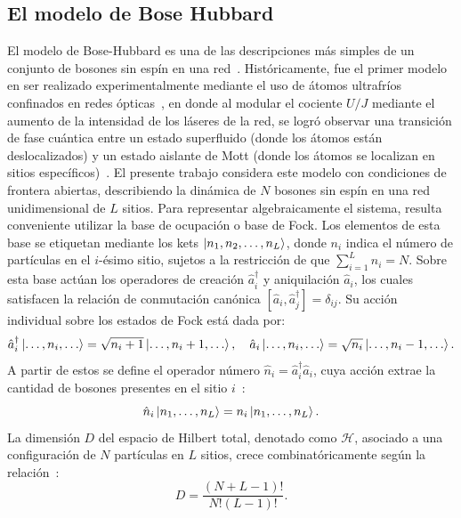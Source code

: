 \documentclass[10pt,a4paper]{article}
\begin{document}
\subsection{El modelo de Bose Hubbard}\label{sec:BH}
El modelo de Bose-Hubbard es una de las descripciones más simples de un conjunto de bosones sin espín en una red~\cite{delacruz2020quantum}. Históricamente, fue el primer modelo en ser realizado experimentalmente mediante el uso de átomos ultrafríos confinados en redes ópticas~\cite{Jaksch1998, greiner2002quantum}, 
en donde al modular el cociente $U/J$ mediante el aumento de la intensidad de los láseres de la red, se logró observar una transición de fase cuántica entre un estado superfluido (donde los átomos están deslocalizados)
 y un estado aislante de Mott (donde los átomos se localizan en sitios específicos)~\cite{greiner2002quantum}. El presente trabajo considera este modelo con condiciones de frontera abiertas, describiendo la dinámica de $N$ bosones sin espín en una red unidimensional de $L$ sitios. Para representar algebraicamente el sistema, resulta conveniente utilizar la base de ocupación o base de Fock. Los elementos de esta base se etiquetan mediante los kets $\ket{n_1,n_2,\dots,n_L}$, donde $n_i$ indica el número de partículas en el $i$-ésimo sitio,
 sujetos a la restricción de que $\sum_{i=1}^{L} n_i = N$. Sobre esta base actúan los operadores de creación $\hat{a}_i^\dagger$ y aniquilación $\hat{a}_i$, 
los cuales satisfacen la relación de conmutación canónica $[\hat{a}_i, \hat{a}_j^\dagger] = \delta_{ij}$. Su acción individual sobre los estados de Fock está dada por:
\begin{equation}
    \hat{a}_i^\dagger \ket{\dots, n_i, \dots} = \sqrt{n_i + 1} \ket{\dots, n_i + 1, \dots}, \quad
    \hat{a}_i \ket{\dots, n_i, \dots} = \sqrt{n_i} \ket{\dots, n_i - 1, \dots}.
\end{equation}
A partir de estos se define el operador número $\hat{n}_i = \hat{a}_i^\dagger \hat{a}_i$, 
cuya acción extrae la cantidad de bosones presentes en el sitio $i$~\cite{Zhang2010}:
\begin{equation}\label{eq:num}
    \hat{n}_i\ket{n_1,\dots,n_L} = n_i\ket{n_1,\dots,n_L}.
\end{equation}
La dimensión $D$ del espacio de Hilbert total, denotado como $\mathcal{H}$, 
asociado a una configuración de $N$ partículas en $L$ sitios, crece combinatóricamente según la relación~\cite{Zhang2010}:
\begin{equation}
    D = \frac{(N+L-1)!}{N!(L-1)!}.
\end{equation}
\end{document}

